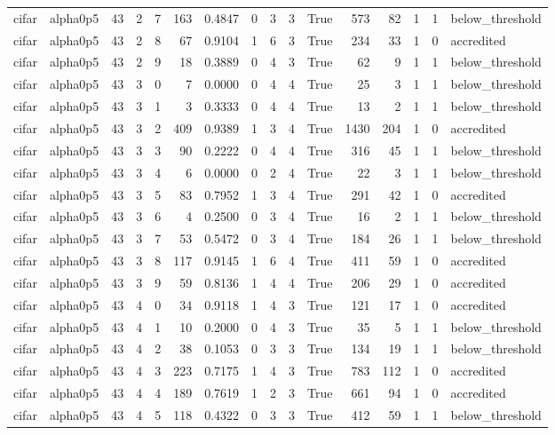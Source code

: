 \begin{tabular}{llrrrrrrrrrrrrrl}
cifar & alpha0p5 & 43 & 2 & 7 & 163 & 0.4847 & 0 & 3 & 3 & True & 573 & 82 & 1 & 1 & below\_threshold \\
cifar & alpha0p5 & 43 & 2 & 8 & 67 & 0.9104 & 1 & 6 & 3 & True & 234 & 33 & 1 & 0 & accredited \\
cifar & alpha0p5 & 43 & 2 & 9 & 18 & 0.3889 & 0 & 4 & 3 & True & 62 & 9 & 1 & 1 & below\_threshold \\
cifar & alpha0p5 & 43 & 3 & 0 & 7 & 0.0000 & 0 & 4 & 4 & True & 25 & 3 & 1 & 1 & below\_threshold \\
cifar & alpha0p5 & 43 & 3 & 1 & 3 & 0.3333 & 0 & 4 & 4 & True & 13 & 2 & 1 & 1 & below\_threshold \\
cifar & alpha0p5 & 43 & 3 & 2 & 409 & 0.9389 & 1 & 3 & 4 & True & 1430 & 204 & 1 & 0 & accredited \\
cifar & alpha0p5 & 43 & 3 & 3 & 90 & 0.2222 & 0 & 4 & 4 & True & 316 & 45 & 1 & 1 & below\_threshold \\
cifar & alpha0p5 & 43 & 3 & 4 & 6 & 0.0000 & 0 & 2 & 4 & True & 22 & 3 & 1 & 1 & below\_threshold \\
cifar & alpha0p5 & 43 & 3 & 5 & 83 & 0.7952 & 1 & 3 & 4 & True & 291 & 42 & 1 & 0 & accredited \\
cifar & alpha0p5 & 43 & 3 & 6 & 4 & 0.2500 & 0 & 3 & 4 & True & 16 & 2 & 1 & 1 & below\_threshold \\
cifar & alpha0p5 & 43 & 3 & 7 & 53 & 0.5472 & 0 & 3 & 4 & True & 184 & 26 & 1 & 1 & below\_threshold \\
cifar & alpha0p5 & 43 & 3 & 8 & 117 & 0.9145 & 1 & 6 & 4 & True & 411 & 59 & 1 & 0 & accredited \\
cifar & alpha0p5 & 43 & 3 & 9 & 59 & 0.8136 & 1 & 4 & 4 & True & 206 & 29 & 1 & 0 & accredited \\
cifar & alpha0p5 & 43 & 4 & 0 & 34 & 0.9118 & 1 & 4 & 3 & True & 121 & 17 & 1 & 0 & accredited \\
cifar & alpha0p5 & 43 & 4 & 1 & 10 & 0.2000 & 0 & 4 & 3 & True & 35 & 5 & 1 & 1 & below\_threshold \\
cifar & alpha0p5 & 43 & 4 & 2 & 38 & 0.1053 & 0 & 3 & 3 & True & 134 & 19 & 1 & 1 & below\_threshold \\
cifar & alpha0p5 & 43 & 4 & 3 & 223 & 0.7175 & 1 & 4 & 3 & True & 783 & 112 & 1 & 0 & accredited \\
cifar & alpha0p5 & 43 & 4 & 4 & 189 & 0.7619 & 1 & 2 & 3 & True & 661 & 94 & 1 & 0 & accredited \\
cifar & alpha0p5 & 43 & 4 & 5 & 118 & 0.4322 & 0 & 3 & 3 & True & 412 & 59 & 1 & 1 & below\_threshold \\

\end{tabular}
